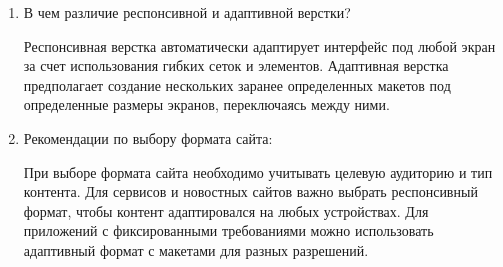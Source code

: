 \begin{enumerate}
    \item В чем различие респонсивной и адаптивной верстки?

    Респонсивная верстка автоматически адаптирует интерфейс под любой экран за счет использования гибких сеток и элементов. Адаптивная верстка предполагает создание нескольких заранее определенных макетов под определенные размеры экранов, переключаясь между ними.

\item Рекомендации по выбору формата сайта:

    При выборе формата сайта необходимо учитывать целевую аудиторию и тип контента. Для сервисов и новостных сайтов важно выбрать респонсивный формат, чтобы контент адаптировался на любых устройствах. Для приложений с фиксированными требованиями можно использовать адаптивный формат с макетами для разных разрешений.


\end{enumerate}



